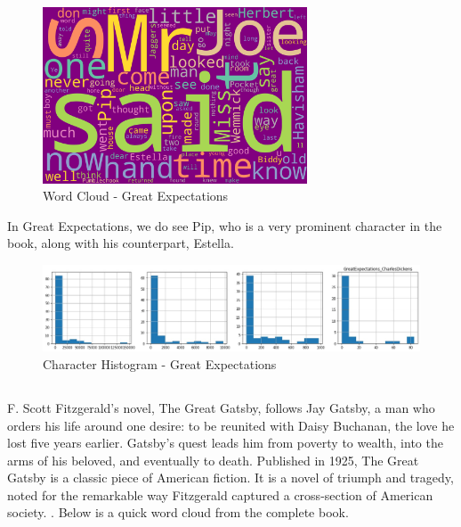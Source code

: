\begin{figure}[H]
	\begin{center}
		\includegraphics[width = 0.7\textwidth]{Images/GreatExpectations_CharlesDickens.jpeg} %
		\caption{Word Cloud - Great Expectations}
		\label{fig:great-expectations}
	\end{center}
\end{figure}

In Great Expectations, we do see Pip, who is a very prominent character in the book, along with his counterpart, Estella.

\begin{figure}[H]
	\begin{center}
		\includegraphics[width = 1.0\textwidth]{Images/char_hist_GreatExpectations_CharlesDickens.jpeg} %
		\caption{Character Histogram - Great Expectations}
		\label{fig:histogram-greatexp}
	\end{center}
\end{figure}

\subsection{\textcite{great-gatsby}} %
\label{sec:great-gatsby} %

F. Scott Fitzgerald's novel, The Great Gatsby, follows Jay Gatsby, a man who orders his life around one desire: to be reunited with Daisy Buchanan, the love he lost five years earlier. Gatsby's quest leads him from poverty to wealth, into the arms of his beloved, and eventually to death. Published in 1925, The Great Gatsby is a classic piece of American fiction. It is a novel of triumph and tragedy, noted for the remarkable way Fitzgerald captured a cross-section of American society. \textcite{great-gatsby-summary}. Below is a quick word cloud from the complete book. 

